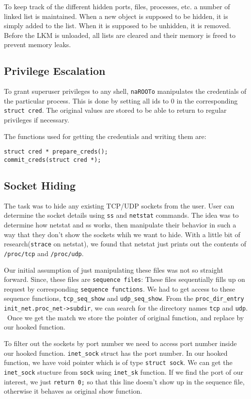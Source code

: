 \documentclass[10pt, letterpaper]{scrartcl}
\begin{document}
To keep track of the different hidden ports, files, processes, etc. a number of linked list is maintained.
When a new object is supposed to be hidden, it is simply added to the list.
When it is supposed to be unhidden, it is removed.
Before the LKM is unloaded, all lists are cleared and their memory is freed to prevent memory leaks.

\subsection{Privilege Escalation}
To grant superuser privileges to any shell, \texttt{naROOTo} manipulates the credentials of the particular process.
This is done by setting all ids to 0 in the corresponding \texttt{struct cred}.
The original values are stored to be able to return to regular privileges if necessary.

The functions used for getting the credentials and writing them are:

\begin{verbatim}
struct cred * prepare_creds();
commit_creds(struct cred *);
\end{verbatim}

\subsection{Socket Hiding}
The task was to hide any existing TCP/UDP sockets from the user. 
User can determine the socket details using \texttt{ss} and \texttt{netstat} commands.
The idea was to determine how netstat and ss works, 
then manipulate their behavior in such a way that they don't show the sockets whih we want to hide. 
With a little bit of research(\texttt{strace} on netstat), 
we found that netstat just prints out the contents of \texttt{/proc/tcp} and \texttt{/proc/udp}.

Our initial assumption of just manipulating these files was not so straight forward. 
Since, these files are \texttt{sequence files}: 
These files sequentially fills up on request by corresponding \texttt{sequence functions}. 
We had to get access to these sequence functions, \texttt{tcp\_seq\_show} and \texttt{udp\_seq\_show}. 
From the \texttt{proc\_dir\_entry} \texttt{init\_net.proc\_net->subdir}, 
we can search for the directory names \texttt{tcp} and \texttt{udp}. \
Once we get the match we store the pointer of original function, and replace by our hooked function. 

To filter out the sockets by port number we need to access port number inside our hooked function. 
\texttt{inet\_sock} struct has the port number. 
In our hooked function, we have void pointer which is of type \texttt{struct sock}. 
We can get the \texttt{inet\_sock} stucture from \texttt{sock} using \texttt{inet\_sk} function. 
If we find the port of our interest, we just \texttt{return 0;} so that this line doesn't show up in the 
sequence file, otherwise it behaves as original show function. 
\end{document}
